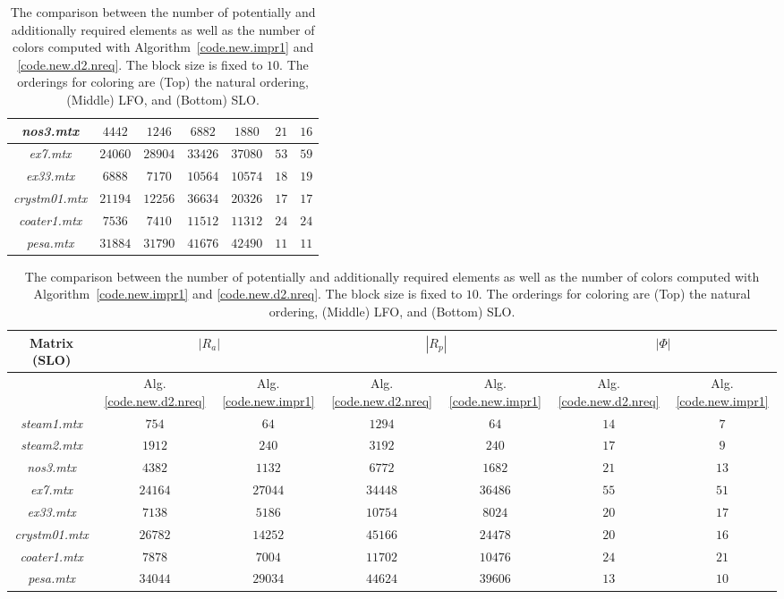 \documentclass[12pt, twoside,a4paper,toc=bibliography]{scrbook}
\newcommand{\coderef}[1]{Algorithm~\protect\ref{#1}}
\begin{document}
\begin{table}
\begin{tabular}{|c|c|c|c|c|c|c|}
\textit{nos3.mtx} & $4442$ & $1246$ & $6882$ & $1880$ & $21$ & $16$\\\hline
\textit{ex7.mtx} & $24060$ & $28904$ & $33426$ & $37080$ & $53$ & $59$\\\hline
\textit{ex33.mtx} & $6888$ & $7170$ & $10564$ & $10574$ & $18$ & $19$\\\hline
\textit{crystm01.mtx} & $21194$ & $12256$ & $36634$ & $20326$ & $17$ & $17$\\\hline
\textit{coater1.mtx} & $7536$ & $7410$ & $11512$ & $11312$ & $24$ & $24$\\\hline
\textit{pesa.mtx} & $31884$ & $31790$ & $41676$ & $42490$ & $11$ & $11$\\\hline
\end{tabular}
\vspace*{1cm}\newline
\begin{tabular}{|c|c|c|c|c|c|c|}
\hline
Matrix (SLO) & \multicolumn{2}{c|}{$|R_a|$} & \multicolumn{2}{c|}{$|R_p|$} & \multicolumn{2}{c|}{$|\Phi|$}\\\hline
{} & Alg.\ref{code.new.d2.nreq}& Alg.\ref{code.new.impr1} & Alg.\ref{code.new.d2.nreq} & Alg.\ref{code.new.impr1}& Alg.\ref{code.new.d2.nreq} & Alg.\ref{code.new.impr1}\\\hline
\textit{steam1.mtx} & $754$ & $64$ & $1294$ & $64$ & $14$ & $7$\\\hline
\textit{steam2.mtx} & $1912$ & $240$ & $3192$ & $240$ & $17$ & $9$\\\hline
\textit{nos3.mtx} & $4382$ & $1132$ & $6772$ & $1682$ & $21$ & $13$\\\hline
\textit{ex7.mtx} & $24164$ & $27044$ & $34448$ & $36486$ & $55$ & $51$\\\hline
\textit{ex33.mtx} & $7138$ & $5186$ & $10754$ & $8024$ & $20$ & $17$\\\hline
\textit{crystm01.mtx} & $26782$ & $14252$ & $45166$ & $24478$ & $20$ & $16$\\\hline
\textit{coater1.mtx} & $7878$ & $7004$ & $11702$ & $10476$ & $24$ & $21$\\\hline
\textit{pesa.mtx} & $34044$ & $29034$ & $44624$ & $39606$ & $13$ & $10$\\\hline
\end{tabular}

\caption{The comparison between the number of potentially and additionally required
elements as well as the number of colors computed with \coderef{code.new.impr1} and \ref{code.new.d2.nreq}.
The block size is fixed to $10$. The orderings for coloring are (Top) the natural ordering,
(Middle) LFO, and (Bottom) SLO.}
\label{mats.pot.add.modified.vs.nreq}
\end{table}
\end{document}

